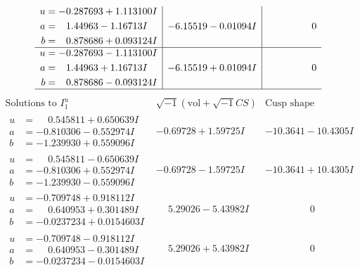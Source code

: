 \documentclass[1p]{elsarticle_modified}
\theoremstyle{definition}
\newcommand{\I}{\sqrt{-1}}
\begin{document}
$$\begin{array}{c|c|c}
\begin{aligned}
u &= -0.287693 + 1.113100 I \\
a &= \phantom{-}1.44963 - 1.16713 I \\
b &= \phantom{-}0.878686 + 0.093124 I\end{aligned}
 & -6.15519 - 0.01094 I & \phantom{-0.000000 } 0 \\ \hline\begin{aligned}
u &= -0.287693 - 1.113100 I \\
a &= \phantom{-}1.44963 + 1.16713 I \\
b &= \phantom{-}0.878686 - 0.093124 I\end{aligned}
 & -6.15519 + 0.01094 I & \phantom{-0.000000 } 0\\
 \hline 
 \end{array}$$\newpage$$\begin{array}{c|c|c}  
\text{Solutions to }I^u_{1}& \I (\text{vol} + \sqrt{-1}CS) & \text{Cusp shape}\\
 \hline 
\begin{aligned}
u &= \phantom{-}0.545811 + 0.650639 I \\
a &= -0.810306 - 0.552974 I \\
b &= -1.239930 + 0.559096 I\end{aligned}
 & -0.69728 + 1.59725 I & -10.3641 - 10.4305 I \\ \hline\begin{aligned}
u &= \phantom{-}0.545811 - 0.650639 I \\
a &= -0.810306 + 0.552974 I \\
b &= -1.239930 - 0.559096 I\end{aligned}
 & -0.69728 - 1.59725 I & -10.3641 + 10.4305 I \\ \hline\begin{aligned}
u &= -0.709748 + 0.918112 I \\
a &= \phantom{-}0.640953 + 0.301489 I \\
b &= -0.0237234 + 0.0154603 I\end{aligned}
 & \phantom{-}5.29026 - 5.43982 I & \phantom{-0.000000 } 0 \\ \hline\begin{aligned}
u &= -0.709748 - 0.918112 I \\
a &= \phantom{-}0.640953 - 0.301489 I \\
b &= -0.0237234 - 0.0154603 I\end{aligned}
 & \phantom{-}5.29026 + 5.43982 I & \phantom{-0.000000 } 0 \\ \hline\begin{aligned}

\end{aligned}
\end{array}$$
\end{document}
